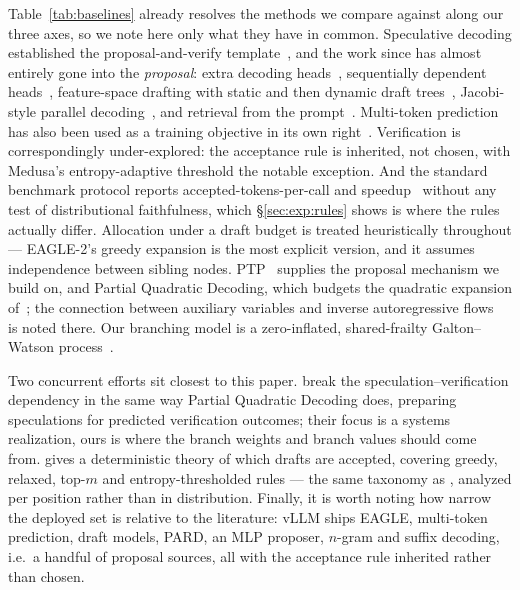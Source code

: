 \documentclass{article} %
\makeatletter
\newenvironment{ai}
  {\color{lightgray}%
   \@ifpackageloaded{caption}{\captionsetup{font={color=lightgray}}}{}%
   \let\ai@savedfloatreset\@floatboxreset
   \g@addto@macro\@floatboxreset{\color{lightgray}}}
  {\global\let\@floatboxreset\ai@savedfloatreset}
\makeatother
\begin{document}
\begin{ai}
Table~\ref{tab:baselines} already resolves the methods we compare against along
our three axes, so we note here only what they have in common. Speculative
decoding established the proposal-and-verify
template~\citep{leviathan2023speculative,chen2023accelerating}, and the work
since has almost entirely gone into the \emph{proposal}: extra decoding
heads~\citep{stern2018blockwise,cai2024medusa}, sequentially dependent
heads~\citep{ankner2024hydra}, feature-space drafting with static and then
dynamic draft trees~\citep{li2024eagle,li2024eagle2}, Jacobi-style parallel
decoding~\citep{fu2024lookahead}, and retrieval from the
prompt~\citep{saxena2023pld}. Multi-token prediction has also been used as a
training objective in its own right~\citep{gloeckle2024multitoken}. Verification
is correspondingly under-explored: the acceptance rule is inherited, not chosen,
with Medusa's entropy-adaptive threshold the notable exception. And the standard
benchmark protocol reports accepted-tokens-per-call and
speedup~\citep{xia2024specbench} without any test of distributional
faithfulness, which \S\ref{sec:exp:rules} shows is where the rules actually
differ. Allocation under a draft budget is treated heuristically throughout ---
EAGLE-2's greedy expansion is the most explicit version, and it assumes
independence between sibling nodes. PTP~\citep{draxler2025ptp} supplies the
proposal mechanism we build on, and Partial Quadratic Decoding, which budgets the
quadratic expansion of~\citet{samragh2025future}; the connection
between auxiliary variables and inverse autoregressive
flows~\citep{kingma2016iaf} is noted there. Our branching model is a
zero-inflated, shared-frailty Galton--Watson process~\citep{athreya1972branching}.

Two concurrent efforts sit closest to this paper.
\citet{kumar2026ssd} break the speculation--verification dependency in the same
way Partial Quadratic Decoding does, preparing speculations for predicted
verification outcomes; their focus is a systems realization, ours is where the
branch weights and branch values should come from.
\citet{sharma2026acceptance} gives a deterministic theory of which drafts are
accepted, covering greedy, relaxed, top-$m$ and entropy-thresholded rules ---
the same taxonomy as , analyzed per position rather than
in distribution. Finally, it is worth noting how narrow the deployed set is
relative to the literature: vLLM ships EAGLE, multi-token prediction, draft
models, PARD, an MLP proposer, $n$-gram and suffix decoding, i.e.\ a handful of
proposal sources, all with the acceptance rule inherited rather than chosen.


\end{ai}
\end{document}
